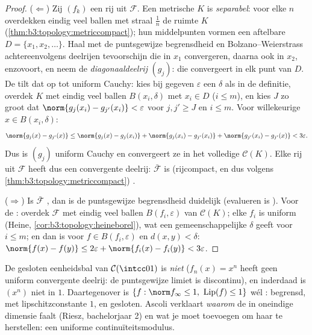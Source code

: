 \begin{proof}
($\Leftarrow$) Zij $(f_k)$ een rij uit $\mathcal F$. Een 
metrische $K$ is \emph{separabel}: voor elke $n$ overdekken
eindig veel ballen met straal $\frac1n$ de ruimte $K$
(\cref{thm:b3:topology:metriccompact}); hun middelpunten vormen
een aftelbare  $D = \{x_1, x_2, \dots\}$. Haal
met de puntsgewijze begrensdheid en Bolzano--Weierstrass
achtereenvolgens deelrijen tevoorschijn die in $x_1$ convergeren,
daarna ook in $x_2$, enzovoort, en neem de
\emph{diagonaaldeelrij} $(g_j)$: die convergeert in elk punt van
$D$. De  tilt dat op tot uniform Cauchy: kies bij
gegeven $\varepsilon$ een $\delta$ als in de definitie, overdek
$K$ met eindig veel ballen $B(x_i, \delta)$ met $x_i \in D$ ($i
\leq m$), en kies $J$ zo groot dat $\norm{g_j(x_i) -
g_{j'}(x_i)} < \varepsilon$ voor $j, j' \geq J$ en $i \leq m$.
Voor willekeurige $x \in B(x_i, \delta)$:
\[
\norm{g_j(x) - g_{j'}(x)}
\leq \norm{g_j(x) - g_j(x_i)} + \norm{g_j(x_i) - g_{j'}(x_i)}
+ \norm{g_{j'}(x_i) - g_{j'}(x)} < 3\varepsilon .
\]
Dus is $(g_j)$ uniform Cauchy en convergeert ze in het volledige
$\mathcal C(K)$. Elke rij uit $\mathcal F$ heeft dus een
convergente deelrij: $\bar{\mathcal F}$ is (rijcompact, en dus
volgens \cref{thm:b3:topology:metriccompact}) .

($\Rightarrow$) Is $\bar{\mathcal F}$ , dan is de
puntsgewijze begrensdheid duidelijk (evalueren is ). Voor
de : overdek $\mathcal F$ met eindig veel ballen
$B(f_i, \varepsilon)$ van $\mathcal C(K)$; elke $f_i$ is uniform
 (Heine, \cref{cor:b3:topology:heineborel}), wat een
gemeenschappelijke $\delta$ geeft voor $i \leq m$; en dan is voor
$f \in B(f_i, \varepsilon)$ en $d(x,y) < \delta$:
$\norm{f(x)-f(y)} \leq 2\varepsilon + \norm{f_i(x)-f_i(y)} <
3\varepsilon$.
\end{proof}

\begin{example}\label{ex:b3:complete:ascoliexamples}
De gesloten eenheidsbal van $\mathcal C(\intcc01)$ is \emph{niet}
 ($f_n(x) = x^n$ heeft geen uniform convergente deelrij:
de puntsgewijze limiet is discontinu), en inderdaad is $(x^n)$
niet  in $1$. Daartegenover is $\{f : \norm f_\infty
\leq 1,\ \operatorname{Lip}(f) \leq 1\}$ wél : begrensd,
 met lipschitzconstante $1$, en gesloten. Ascoli
verklaart \emph{waarom} de  in oneindige dimensie
faalt (Riesz, bachelorjaar 2) en wat je moet toevoegen om haar te
herstellen: een uniforme continuïteitsmodulus.
\end{example}


